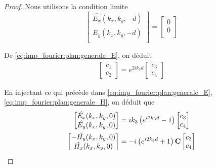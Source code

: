         \begin{proof}
            Nous utilisons la condition limite 
            \begin{equation}
                \begin{bmatrix}
                    \hat{E_x}(k_x,k_y,-d)\\
                    \hat{E_y}(k_x,k_y,-d)\\
                \end{bmatrix}
                =
                \begin{bmatrix}
                    0\\
                    0\\
                \end{bmatrix}
            \end{equation}

            De \eqref{eq:imp_fourier:plan:generale_E}, on déduit
            \begin{align}
                \begin{bmatrix}
                    c_1 \\
                    c_2
                \end{bmatrix}
                = e^{2ik_3 d}
                \begin{bmatrix}
                    c_3 \\
                    c_4
                \end{bmatrix}
            \end{align}

            En injectant ce qui précède dans \eqref{eq:imp_fourier:plan:generale_E},\eqref{eq:imp_fourier:plan:generale_H}, on déduit que
            \begin{align}
                \begin{bmatrix}
                    \hat{E_x}(k_x,k_y,0)\\
                    \hat{E_y}(k_x,k_y,0)\\
                \end{bmatrix}
                &=ik_3\left( e^{i2k_3 d} -1 \right)
                \begin{bmatrix}
                    c_3 \\
                    c_4
                \end{bmatrix} \\
                \begin{bmatrix}
                    -\hat{H_y}(k_x,k_y,0)\\
                    \hat{H_x}(k_x,k_y,0)\\
                \end{bmatrix}
                & = - i\left(e^{i2k_3 d} +1 \right)
                \mathbf{C}
                \begin{bmatrix}
                c_3 \\
                c_4
                \end{bmatrix}
            \end{align}


\end{proof}

